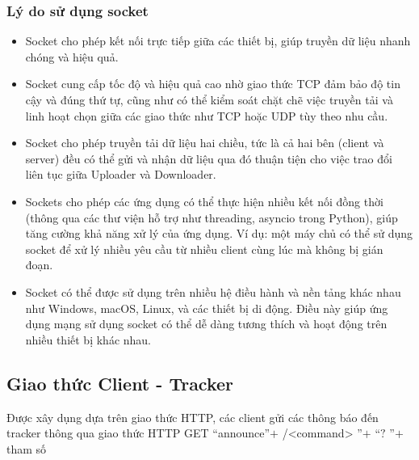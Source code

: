 \documentclass[a4paper]{article}
\begin{document}
        \subsubsection{Lý do sử dụng socket}
        \begin{itemize}
            \item Socket cho phép kết nối trực tiếp giữa các thiết bị, giúp truyền dữ liệu nhanh chóng và hiệu quả.
            \item Socket cung cấp tốc độ và hiệu quả cao nhờ giao thức TCP đảm bảo độ tin cậy và đúng thứ tự, cũng như có thể kiểm soát chặt chẽ việc truyền tải và linh hoạt chọn giữa các giao thức như TCP hoặc UDP tùy theo nhu cầu.
            \item Socket cho phép truyền tải dữ liệu hai chiều, tức là cả hai bên (client và server) đều có thể gửi và nhận dữ liệu qua đó thuận tiện cho việc trao đổi liên tục giữa Uploader và Downloader.
            \item Sockets cho phép các ứng dụng có thể thực hiện nhiều kết nối đồng thời (thông qua các thư viện hỗ trợ như threading, asyncio trong Python), giúp tăng cường khả năng xử lý của ứng dụng. Ví dụ: một máy chủ có thể sử dụng socket để xử lý nhiều yêu cầu từ nhiều client cùng lúc mà không bị gián đoạn.
            \item Socket có thể được sử dụng trên nhiều hệ điều hành và nền tảng khác nhau như Windows, macOS, Linux, và các thiết bị di động. Điều này giúp ứng dụng mạng sử dụng socket có thể dễ dàng tương thích và hoạt động trên nhiều thiết bị khác nhau.
        \end{itemize}

    \subsection{Giao thức Client - Tracker}
    Được xây dụng dựa trên giao thức HTTP, các client gửi các thông báo đến tracker thông qua giao thức HTTP GET \textquotedblleft \/announce\textquotedblright $+$ /<command> \textquotedblright $+$ \textquotedblleft $?$ \textquotedblright $+$  tham số
\end{document}
